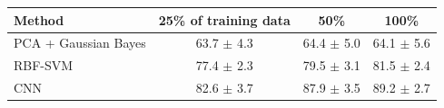 \begin{tabular}{@{}lccc@{}}\toprule
Method & 25\% of training data & 50\% & 100\%\\\midrule
PCA + Gaussian Bayes & 63.7 $\pm$ 4.3 & 64.4 $\pm$ 5.0 & 64.1 $\pm$ 5.6 \\
RBF-SVM & 77.4 $\pm$ 2.3 & 79.5 $\pm$ 3.1 & 81.5 $\pm$ 2.4 \\
CNN & 82.6 $\pm$ 3.7 & 87.9 $\pm$ 3.5 & 89.2 $\pm$ 2.7 \\
\bottomrule\end{tabular}
